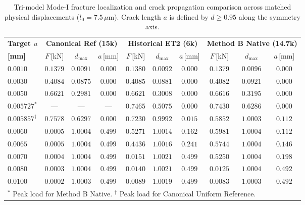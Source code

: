 \begin{table}[htbp]
\centering
\small
\caption{Tri-model Mode-I fracture localization and crack propagation comparison across matched physical displacements ($l_0 = 7.5\,\mu\mathrm{m}$). Crack length $a$ is defined by $d \ge 0.95$ along the symmetry axis.}
\label{tab:mode1_trimodel_matched_states}
\begin{tabular}{l ccc ccc ccc}
\hline
\textbf{Target $u$} & \multicolumn{3}{c}{\textbf{Canonical Ref (15k)}} & \multicolumn{3}{c}{\textbf{Historical ET2 (6k)}} & \multicolumn{3}{c}{\textbf{Method B Native (14.7k)}} \\
\textbf{[mm]} & $F$\,[kN] & $d_{\max}$ & $a$\,[mm] & $F$\,[kN] & $d_{\max}$ & $a$\,[mm] & $F$\,[kN] & $d_{\max}$ & $a$\,[mm] \\
\hline
$0.0010$ & $0.1379$ & $0.0091$ & $0.000$ & $0.1380$ & $0.0092$ & $0.000$ & $0.1379$ & $0.0096$ & $0.000$ \\
$0.0030$ & $0.4084$ & $0.0875$ & $0.000$ & $0.4085$ & $0.0881$ & $0.000$ & $0.4082$ & $0.0921$ & $0.000$ \\
$0.0050$ & $0.6621$ & $0.2981$ & $0.000$ & $0.6621$ & $0.3008$ & $0.000$ & $0.6616$ & $0.3195$ & $0.000$ \\
$0.005727^*$ & --- & --- & --- & $0.7465$ & $0.5075$ & $0.000$ & $\mathbf{0.7430}$ & $0.6286$ & $0.000$ \\
$0.005857^\dagger$ & $\mathbf{0.7578}$ & $0.6297$ & $0.000$ & $\mathbf{0.7230}$ & $0.9992$ & $0.015$ & $0.5852$ & $1.0003$ & $0.112$ \\
$0.0060$ & $0.0005$ & $1.0004$ & $0.499$ & $0.5271$ & $1.0014$ & $0.162$ & $0.5981$ & $1.0004$ & $0.112$ \\
$0.0065$ & $0.0005$ & $1.0004$ & $0.499$ & $0.4436$ & $1.0016$ & $0.241$ & $0.5744$ & $1.0004$ & $0.146$ \\
$0.0070$ & $0.0004$ & $1.0004$ & $0.499$ & $0.0151$ & $1.0021$ & $0.499$ & $0.5250$ & $1.0004$ & $0.198$ \\
$0.0080$ & $0.0003$ & $1.0004$ & $0.499$ & $0.0140$ & $1.0021$ & $0.499$ & $0.0125$ & $1.0004$ & $0.492$ \\
$0.0100$ & $0.0002$ & $1.0003$ & $0.499$ & $0.0089$ & $1.0019$ & $0.499$ & $0.0083$ & $1.0003$ & $0.492$ \\
\hline
\multicolumn{10}{l}{\footnotesize $^*$ Peak load for Method B Native. $^\dagger$ Peak load for Canonical Uniform Reference.}
\end{tabular}
\end{table}

